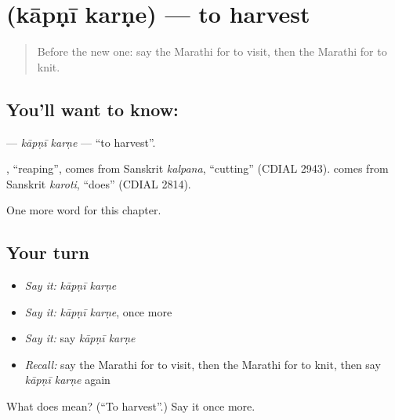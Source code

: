 \section[\texorpdfstring{\mr{कापणी} \mr{करणे} (kāpṇī karṇe)}{कापणी करणे (kāpṇī karṇe)}]{  (kāpṇī karṇe) — to harvest}

\label{lesson:MR-C199-kapni-karne}



\begin{quote}
Before the new one: say the Marathi for to visit, then the Marathi for to knit.
\end{quote}

\subsection*{You'll want to know:  }
\textbf{ } — \emph{kāpṇī karṇe} — \textquotedblleft{}to harvest\textquotedblright{}.

\begin{cousinweb}
\textbf{}, \textquotedblleft{}reaping\textquotedblright{}, comes from Sanskrit \emph{kalpana}, \textquotedblleft{}cutting\textquotedblright{} (CDIAL 2943). \textbf{} comes from Sanskrit \emph{karoti}, \textquotedblleft{}does\textquotedblright{} (CDIAL 2814).
\end{cousinweb}

\begin{grammarlens}[title={What you've built}]
One more word for this chapter.
\end{grammarlens}

\subsection*{Your turn}
\begin{itemize}
\raggedright
  \item \emph{Say it:} \emph{kāpṇī karṇe}
  \item \emph{Say it:} \emph{kāpṇī karṇe}, once more
  \item \emph{Say it:} say \emph{kāpṇī karṇe}
  \item \emph{Recall:} say the Marathi for to visit, then the Marathi for to knit, then say \emph{kāpṇī karṇe} again
\end{itemize}

\begin{tcolorbox}[breakable,colback=teal!4,colframe=teal!35!black,title={Before you move on}]
What does   mean? (\textquotedblleft{}To harvest\textquotedblright{}.) Say it once more.
\end{tcolorbox}

